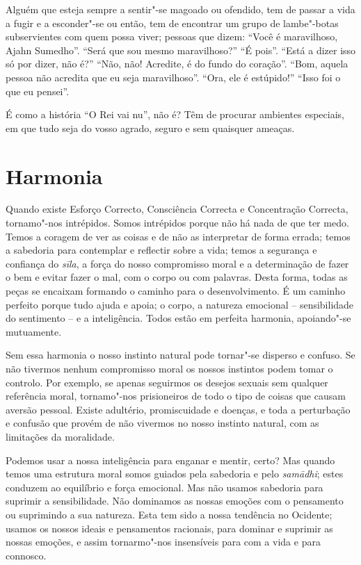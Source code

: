 Alguém que esteja sempre a sentir"-se magoado ou ofendido, tem de passar a vida a
fugir e a esconder"-se ou então, tem de encontrar um grupo de lambe"-botas
subservientes com quem possa viver; pessoas que dizem: “Você é maravilhoso,
Ajahn Sumedho”. “Será que sou mesmo maravilhoso?” “É pois”. “Está a dizer isso
só por dizer, não é?” “Não, não! Acredite, é do fundo do coração”. “Bom, aquela
pessoa não acredita que eu seja maravilhoso”. “Ora, ele é estúpido!” “Isso foi o
que eu pensei”.

É como a história “O Rei vai nu”, não é? Têm de procurar ambientes especiais, em
que tudo seja do vosso agrado, seguro e sem quaisquer ameaças.

\section{Harmonia}

Quando existe Esforço Correcto, Consciência Correcta e Concentração Correcta,
tornamo"-nos intrépidos. Somos intrépidos porque não há nada de que ter medo.
Temos a coragem de ver as coisas e de não as interpretar de forma errada; temos
a sabedoria para contemplar e reflectir sobre a vida; temos a segurança e
confiança do \emph{sīla}, a força do nosso compromisso moral e a determinação de
fazer o bem e evitar fazer o mal, com o corpo ou com palavras. Desta forma,
todas as peças se encaixam formando o caminho para o desenvolvimento. É um
caminho perfeito porque tudo ajuda e apoia; o corpo, a natureza emocional –
sensibilidade do sentimento – e a inteligência. Todos estão em perfeita
harmonia, apoiando"-se mutuamente.

Sem essa harmonia o nosso instinto natural pode tornar"-se disperso e confuso. Se
não tivermos nenhum compromisso moral os nossos instintos podem tomar o
controlo. Por exemplo, se apenas seguirmos os desejos sexuais sem qualquer
referência moral, tornamo"-nos prisioneiros de todo o tipo de coisas que causam
aversão pessoal. Existe adultério, promiscuidade e doenças, e toda a perturbação
e confusão que provém de não vivermos no nosso instinto natural, com as
limitações da moralidade.

Podemos usar a nossa inteligência para enganar e mentir, certo? Mas quando temos
uma estrutura moral somos guiados pela sabedoria e pelo \emph{samādhi}; estes
conduzem ao equilíbrio e força emocional. Mas não usamos sabedoria para suprimir
a sensibilidade. Não dominamos as nossas emoções com o pensamento ou suprimindo
a sua natureza. Esta tem sido a nossa tendência no Ocidente; usamos os nossos
ideais e pensamentos racionais, para dominar e suprimir as nossas emoções, e
assim tornarmo"-nos insensíveis para com a vida e para connosco.

